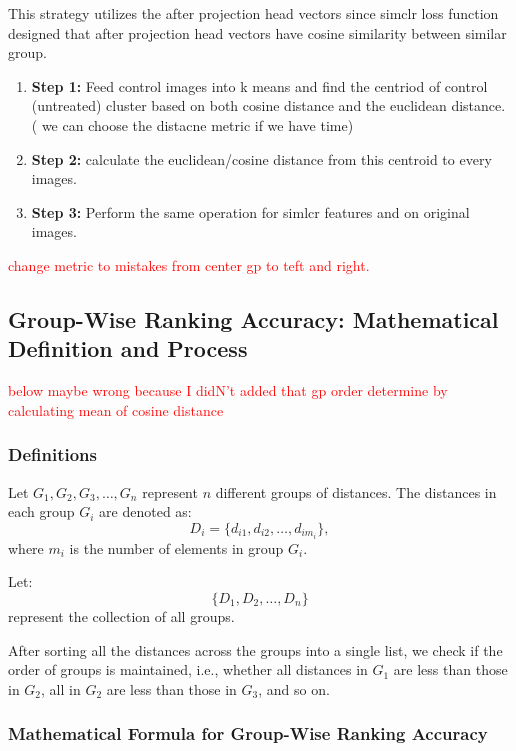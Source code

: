 This strategy utilizes the after projection head vectors since simclr loss function designed that after projection head vectors have cosine similarity between similar 
group.

\begin{enumerate}
  \item \textbf{Step 1:} Feed control images into k means and find the centriod of control (untreated) cluster based on both cosine distance and the euclidean distance. 
  ( we can choose the distacne metric if we have time)
  
  \item \textbf{Step 2:} calculate the euclidean/cosine distance from this centroid to every images.
  
  \item \textbf{Step 3:} Perform the same operation for simlcr features and on original images.
\end{enumerate}

\textcolor{red}{change metric to mistakes from center gp to teft and right.}

\subsection*{Group-Wise Ranking Accuracy: Mathematical Definition and Process}

\textcolor{red}{below maybe wrong because I didN't added that gp order determine by calculating mean of cosine distance}

\subsubsection*{Definitions}

Let \( G_1, G_2, G_3, \dots, G_n \) represent \( n \) different groups of distances.  
The distances in each group \( G_i \) are denoted as:
\[
D_i = \{d_{i1}, d_{i2}, \dots, d_{im_i}\},
\]
where \( m_i \) is the number of elements in group \( G_i \).  

Let:
\[
\{D_1, D_2, \dots, D_n\}
\]
represent the collection of all groups.

After sorting all the distances across the groups into a single list, we check if the order of groups is maintained, i.e., whether all distances in \( G_1 \) are less than those in \( G_2 \), all in \( G_2 \) are less than those in \( G_3 \), and so on.

\subsubsection*{Mathematical Formula for Group-Wise Ranking Accuracy}

